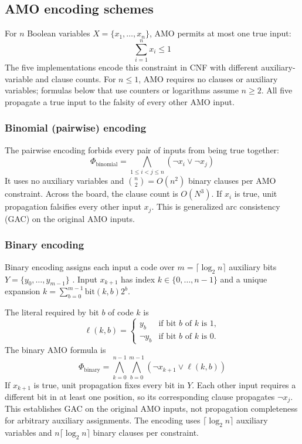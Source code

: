 \documentclass[a4paper,fleqn]{cas-sc}
\begin{document}
\subsection{AMO encoding schemes}
For $n$ Boolean variables $X=\{x_1,\dots,x_n\}$, AMO permits at most one true input:
\begin{equation}
\sum_{i=1}^{n} x_i \leq 1
\end{equation}
The five implementations encode this constraint in CNF with different auxiliary-variable and clause counts. For $n\leq1$, AMO requires no clauses or auxiliary variables; formulas below that use counters or logarithms assume $n\geq2$. All five propagate a true input to the falsity of every other AMO input.

\subsubsection{Binomial (pairwise) encoding}
The pairwise encoding forbids every pair of inputs from being true together:
\begin{equation}
\Phi_{\text{binomial}} = \bigwedge_{1 \leq i < j \leq n} (\neg x_i \vee \neg x_j)
\end{equation}
It uses no auxiliary variables and $\binom{n}{2}=O(n^2)$ binary clauses per AMO constraint. Across the board, the clause count is $O(N^3)$. If $x_i$ is true, unit propagation falsifies every other input $x_j$. This is generalized arc consistency (GAC) on the original AMO inputs.

\subsubsection{Binary encoding}
Binary encoding assigns each input a code over $m=\lceil\log_2n\rceil$ auxiliary bits $Y=\{y_0,\dots,y_{m-1}\}$ \cite{frisch2005sat}. Input $x_{k+1}$ has index $k\in\{0,\dots,n-1\}$ and a unique expansion $k=\sum_{b=0}^{m-1}\text{bit}(k,b)2^b$.

The literal required by bit $b$ of code $k$ is
\begin{equation}
\ell(k, b) = \begin{cases}
y_b & \text{if bit } b \text{ of } k \text{ is } 1, \\
\neg y_b & \text{if bit } b \text{ of } k \text{ is } 0.
\end{cases}
\end{equation}
The binary AMO formula is
\begin{equation}
\Phi_{\text{binary}} = \bigwedge_{k=0}^{n-1} \bigwedge_{b=0}^{m-1} (\neg x_{k+1} \vee \ell(k, b))
\end{equation}
If $x_{k+1}$ is true, unit propagation fixes every bit in $Y$. Each other input requires a different bit in at least one position, so its corresponding clause propagates $\neg x_j$. This establishes GAC on the original AMO inputs, not propagation completeness for arbitrary auxiliary assignments. The encoding uses $\lceil\log_2n\rceil$ auxiliary variables and $n\lceil\log_2n\rceil$ binary clauses per constraint.
\end{document}
